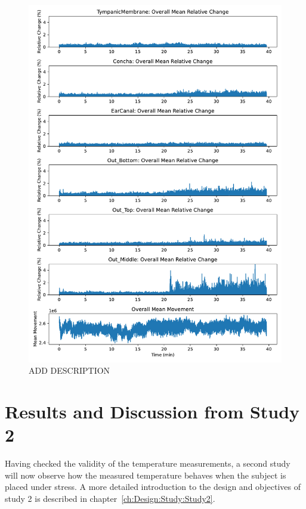 \begin{figure}[t]
    \centering
    \includegraphics[width=\textwidth]{thesis-doc/images/study1/hypothesis5/overall_mean_data_hypothesis5.pdf}
    \caption{ADD DESCRIPTION}    
    \label{fig:eval:study1:hypothesis5_result}
\end{figure}


\section{Results and Discussion from Study 2}
\label{sec:Evaluation:Study2}
Having checked the validity of the temperature measurements, a second study will now observe how the measured temperature behaves when the subject is placed under stress.
A more detailed introduction to the design and objectives of study 2 is described in chapter~\ref{ch:Design:Study:Study2}.

